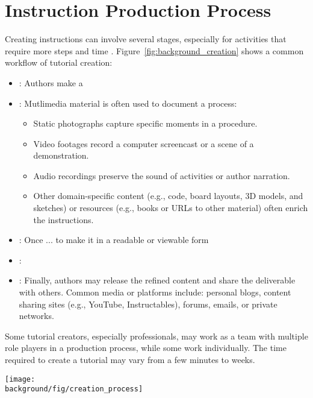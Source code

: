 
\section{Instruction Production Process}
\label{background_creation}

Creating instructions can involve several stages, especially for activities that require more steps and time .
%
Figure~\ref{fig:background_creation} shows a common workflow of tutorial creation:

\begin{itemize}
  \item {}:
    Authors make a
  \item {}:
    Mutlimedia material is often used to document a process:
    \begin{itemize}
      \itemsep -2pt
      \item Static photographs capture specific moments in a procedure.
      \item Video footages record a computer screencast or a scene of a demonstration.
      \item Audio recordings preserve the sound of activities or author narration.
      \item Other domain-specific content (e.g., code, board layouts, 3D models, and sketches) or resources (e.g., books or URLs to other material) often enrich the instructions.
    \end{itemize}
  \item {}:
    Once ... to make it in a readable or viewable form
  \item {}:
  \item {}:
    Finally, authors may release the refined content and share the deliverable with others. Common media or platforms include: personal blogs, content sharing sites (e.g., YouTube, Instructables), forums, emails, or private networks.
\end{itemize}

Some tutorial creators, especially professionals, may work as a team with multiple role players in a production process, while some work individually. The time required to create a tutorial may vary from a few minutes to weeks.

\begin{figure*}[t]
  \centering
  \texttt{[image: \\background/fig/creation\_process]}
  \caption{A common workflow of tutorial creation. }
  \label{fig:background_creation}
\end{figure*}
